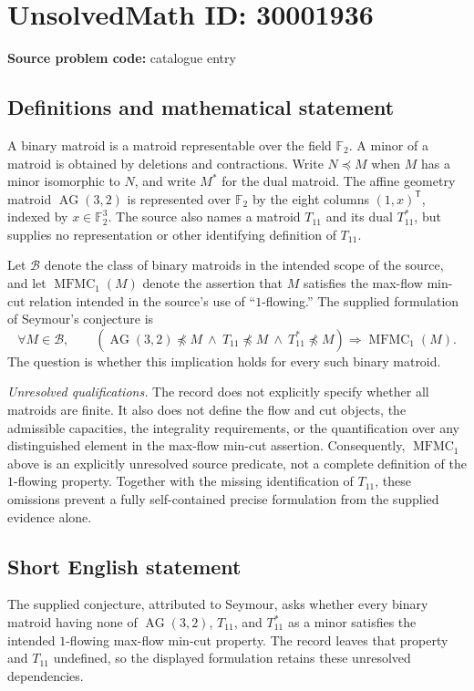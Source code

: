 \documentclass[11pt]{article}
\newcommand{\F}{\mathbb{F}}
\begin{document}
\section*{UnsolvedMath ID: 30001936}
\textbf{Source problem code:} catalogue entry
\subsection{Definitions and mathematical statement}
A binary matroid is a matroid representable over the field \(\F_2\). A minor of a matroid is obtained by deletions and contractions. Write \(N\preccurlyeq M\) when \(M\) has a minor isomorphic to \(N\), and write \(M^*\) for the dual matroid. The affine geometry matroid \(\operatorname{AG}(3,2)\) is represented over \(\F_2\) by the eight columns \((1,x)^{\mathsf T}\), indexed by \(x\in\F_2^3\). The source also names a matroid \(T_{11}\) and its dual \(T_{11}^*\), but supplies no representation or other identifying definition of \(T_{11}\).

Let \(\mathcal B\) denote the class of binary matroids in the intended scope of the source, and let \(\operatorname{MFMC}_1(M)\) denote the assertion that \(M\) satisfies the max-flow min-cut relation intended in the source's use of ``\(1\)-flowing.'' The supplied formulation of Seymour's conjecture is
\[
\forall M\in\mathcal B,\qquad
\left(
\operatorname{AG}(3,2)\not\preccurlyeq M
\ \land\ T_{11}\not\preccurlyeq M
\ \land\ T_{11}^*\not\preccurlyeq M
\right)
\Longrightarrow \operatorname{MFMC}_1(M).
\]
The question is whether this implication holds for every such binary matroid.

\emph{Unresolved qualifications.} The record does not explicitly specify whether all matroids are finite. It also does not define the flow and cut objects, the admissible capacities, the integrality requirements, or the quantification over any distinguished element in the max-flow min-cut assertion. Consequently, \(\operatorname{MFMC}_1\) above is an explicitly unresolved source predicate, not a complete definition of the \(1\)-flowing property. Together with the missing identification of \(T_{11}\), these omissions prevent a fully self-contained precise formulation from the supplied evidence alone.
\subsection{Short English statement}
The supplied conjecture, attributed to Seymour, asks whether every binary matroid having none of \(\operatorname{AG}(3,2)\), \(T_{11}\), and \(T_{11}^*\) as a minor satisfies the intended \(1\)-flowing max-flow min-cut property. The record leaves that property and \(T_{11}\) undefined, so the displayed formulation retains these unresolved dependencies.
\end{document}
